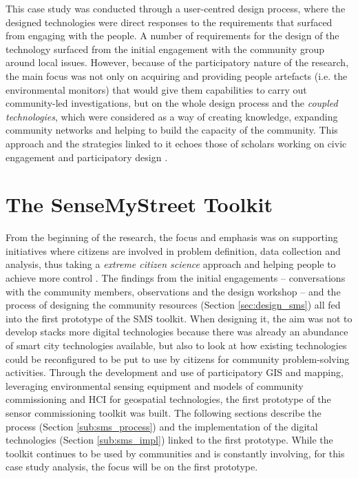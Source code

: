 \noindent
This case study was conducted through a user-centred design process, where the designed technologies were direct responses to the requirements that surfaced from engaging with the people. A number of requirements for the design of the technology surfaced from the initial engagement with the community group around local issues. However, because of the participatory nature of the research, the main focus was not only on acquiring and providing people artefacts (i.e. the environmental monitors) that would give them capabilities to carry out community-led investigations, but on the whole design process and the \textit{coupled technologies}, which were considered as a way of creating knowledge, expanding community networks and helping to build the capacity of the community. This approach and the strategies linked to it echoes those of scholars working on civic engagement \citep{asad_tap_2017} and participatory design \citep{vines_configuring_2013,binder_design_2011}.

\section{The SenseMyStreet Toolkit}
\label{sec:sms-toolkit}
From the beginning of the research, the focus and emphasis was on supporting initiatives where citizens are involved in problem definition, data collection and analysis, thus taking a \textit{extreme citizen science} \citep{haklay_citizen_2013} approach and helping people to achieve more control \citep{arnstein_ladder_1969}. 
The findings from the initial engagements -- conversations with the community members, observations and the design workshop -- and the process of designing the community resources (Section \ref{sec:design_sms}) all fed into the first prototype of the SMS toolkit. When designing it, the aim was not to develop stacks more digital technologies because there was already an abundance of smart city technologies available, but also to look at how existing technologies could be reconfigured to be put to use by citizens for community problem-solving activities. Through the development and use of participatory GIS and mapping, leveraging environmental sensing equipment and models of community commissioning \citet{garbett_designing_2017} and HCI for geospatial technologies, the first prototype of the sensor commissioning toolkit was built. The following sections describe the process (Section \ref{sub:sms_process}) and the implementation of the digital technologies (Section \ref{sub:sms_impl}) linked to the first prototype. While the toolkit continues to be used by communities and is constantly involving, for this case study analysis, the focus will be on the first prototype.

